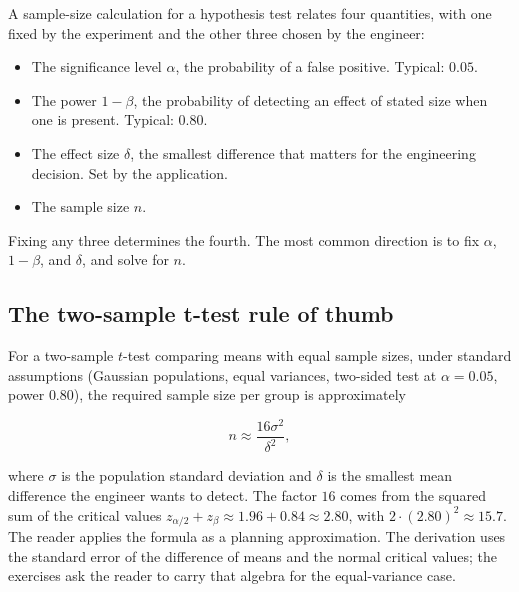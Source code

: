 A sample-size calculation for a hypothesis test relates four
quantities, with one fixed by the experiment and the other three
chosen by the engineer:

\begin{itemize}[leftmargin=*]
  \item The significance level $\alpha$, the probability of a false
    positive. Typical: $0.05$.
  \item The power $1 - \beta$, the probability of detecting an
    effect of stated size when one is present. Typical: $0.80$.
  \item The effect size $\delta$, the smallest difference that
    matters for the engineering decision. Set by the application.
  \item The sample size $n$.
\end{itemize}

Fixing any three determines the fourth. The most common direction
is to fix $\alpha$, $1 - \beta$, and $\delta$, and solve for $n$.

\subsection{The two-sample t-test rule of thumb}

For a two-sample $t$-test comparing means with equal sample sizes,
under standard assumptions (Gaussian populations, equal variances,
two-sided test at $\alpha = 0.05$, power $0.80$), the required
sample size per group is approximately

\[
n \approx \frac{16 \sigma^{2}}{\delta^{2}},
\]

where $\sigma$ is the population standard deviation and $\delta$ is
the smallest mean difference the engineer wants to detect. The
factor $16$ comes from the squared sum of the critical values
$z_{\alpha/2} + z_{\beta} \approx 1.96 + 0.84 \approx 2.80$, with
$2 \cdot (2.80)^{2} \approx 15.7$. The reader applies the formula
as a planning approximation. The derivation uses the standard error
of the difference of means and the normal critical values; the
exercises ask the reader to carry that algebra for the
equal-variance case.


